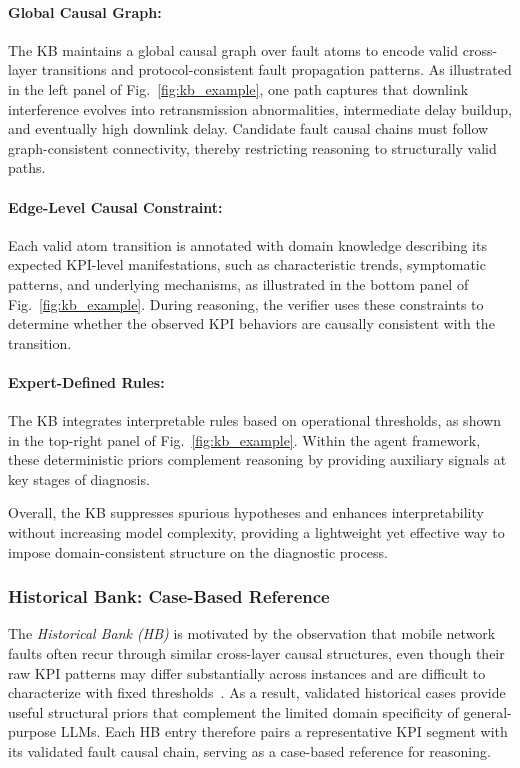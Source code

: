 \documentclass[sigconf,10pt]{acmart} %
\begin{document}
\paragraph{Global Causal Graph:}
The KB maintains a global causal graph over fault atoms to encode valid cross-layer transitions and protocol-consistent fault propagation patterns. As illustrated in the left panel of Fig.~\ref{fig:kb_example}, one path captures that downlink interference evolves into retransmission abnormalities, intermediate delay buildup, and eventually high downlink delay. Candidate fault causal chains must follow graph-consistent connectivity, thereby restricting reasoning to structurally valid paths.

\paragraph{Edge-Level Causal Constraint:}
Each valid atom transition is annotated with domain knowledge describing its expected KPI-level manifestations, such as characteristic trends, symptomatic patterns, and underlying mechanisms, as illustrated in the bottom panel of Fig.~\ref{fig:kb_example}. During reasoning, the verifier uses these constraints to determine whether the observed KPI behaviors are causally consistent with the transition.

\paragraph{Expert-Defined Rules:}
The KB integrates interpretable rules based on operational thresholds, as shown in the top-right panel of Fig.~\ref{fig:kb_example}. Within the agent framework, these deterministic priors complement reasoning by providing auxiliary signals at key stages of diagnosis.

Overall, the KB suppresses spurious hypotheses and enhances interpretability without increasing model complexity, providing a lightweight yet effective way to impose domain-consistent structure on the diagnostic process.

\subsubsection{Historical Bank: Case-Based Reference}
\label{subsec:historical-bank}
The \emph{Historical Bank (HB)} is motivated by the observation that mobile network faults often recur through similar cross-layer causal structures, even though their raw KPI patterns may differ substantially across instances and are difficult to characterize with fixed thresholds~\cite{nouioua2021survey,10427016}. As a result, validated historical cases provide useful structural priors that complement the limited domain specificity of general-purpose LLMs. Each HB entry therefore pairs a representative KPI segment with its validated fault causal chain, serving as a case-based reference for reasoning.
\end{document}
